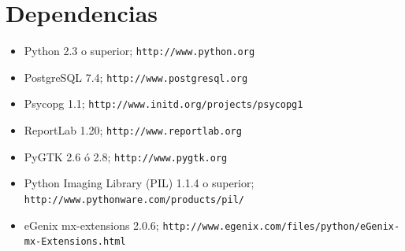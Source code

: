 \documentclass[a4paper]{article}
\newcommand{\marginalnote}[1]{\mbox{}\marginpar{\raggedright\hspace{0pt}#1}}
\newcommand{\iconomargen}[2]{%
  \marginalnote{%
    \parbox[t][\baselineskip * (#1-1)][b]{\marginparwidth}{%
      \texttt{[image: \#2]}%
    }
  }
}
\begin{document}
    \section{Dependencias}
\iconomargen{3}{link}
        \begin{itemize}
        \item Python 2.3 o superior; \texttt{http://www.python.org}
        \item PostgreSQL 7.4; \texttt{http://www.postgresql.org}
        \item Psycopg 1.1; \texttt{http://www.initd.org/projects/psycopg1}
        \item ReportLab 1.20; \texttt{http://www.reportlab.org}
        \item PyGTK 2.6 ó 2.8; \texttt{http://www.pygtk.org}
        \item Python Imaging Library (PIL) 1.1.4 o superior; \texttt{http://www.pythonware.com/products/pil/}
        \item eGenix mx-extensions 2.0.6; \texttt{http://www.egenix.com/files/python/eGenix-mx-Extensions.html}
        \end{itemize}
\end{document}

